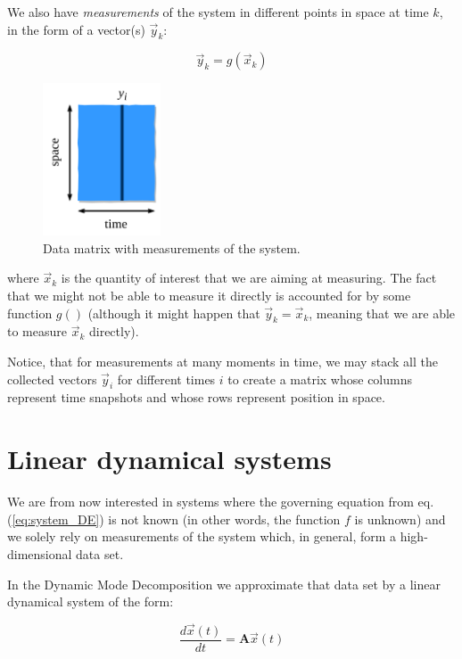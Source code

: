 \documentclass[10pt,twocolumn]{article}
\begin{document}
We also have \textit{measurements} of the system in different points in space at time $k$, in the form of a vector(s) $\vec{y}_k$:

\begin{equation}
\vec{y}_k = g(\vec{x}_k)
\end{equation}

\begin{figure}
\centering\includegraphics[width=3.5cm]{data-matrix.png}
\caption{Data matrix with measurements of the system.}
\label{fig:data-matrix}
\end{figure}

where $\vec{x}_k$ is the quantity of interest that we are aiming at measuring. The fact that we might not be able to measure it directly is accounted for by some function $g()$ (although it might happen that $\vec{y}_k = \vec{x}_k$, meaning that we are able to measure $\vec{x}_k$ directly).

Notice, that for measurements at many moments in time, we may stack all the collected vectors $\vec{y}_i$ for different times $i$ to create a matrix whose columns represent time snapshots and whose rows represent position in space.

\section{Linear dynamical systems}

We are from now interested in systems where the governing equation from eq.(\ref{eq:system_DE}) is not known (in other words, the function $f$ is unknown) and we solely rely on measurements of the system which, in general, form a high-dimensional data set.

In the Dynamic Mode Decomposition we approximate that data set by a linear dynamical system of the form:

\begin{equation} \label{eq:system_linear}
\frac{d \vec{x}(t)}{dt} = \bm{A} \vec{x}(t)
\end{equation}
\end{document}
